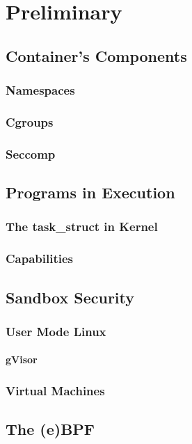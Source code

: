 \chapter{Preliminary}

\section{Container's Components}
\subsection{Namespaces}
\subsection{Cgroups}
\subsection{Seccomp}

\section{Programs in Execution}
\subsection{The task\_struct in Kernel}
\subsection{Capabilities}

\section{Sandbox Security}
\subsection{User Mode Linux}
\subsubsection{gVisor}
\subsection{Virtual Machines}

\section{The (e)BPF}
